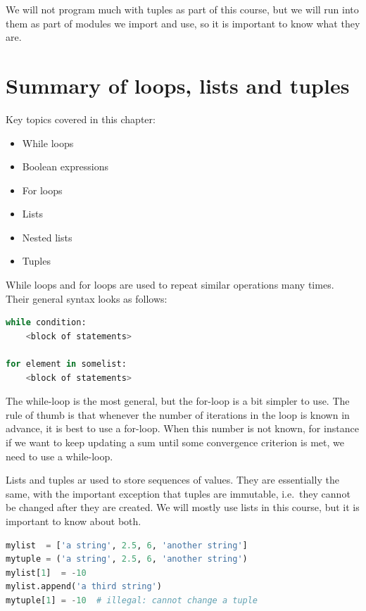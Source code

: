 \documentclass[graybox,envcountchap,sectrefs,final]{svmonodo}
\begin{document}
\noindent
We will not program much with tuples as part of this course, but we will run into them as part of modules
we import and use, so it is important to know what they are.

\section{Summary of loops, lists and tuples}
Key topics covered in this chapter:

\begin{itemize}
 \item While loops

 \item Boolean expressions

 \item For loops

 \item Lists

 \item Nested lists

 \item Tuples
\end{itemize}

\noindent
While loops and for loops are used to repeat similar operations many times. Their general syntax looks as follows:

\begin{lstlisting}[language=Python,style=blue1]
while condition:
    <block of statements>

for element in somelist:
    <block of statements>
\end{lstlisting}
The while-loop is the most general, but the for-loop is a bit simpler to use. The rule of thumb is that whenever
the number of iterations in the loop is known in advance, it is best to use a for-loop. When this number is not known,
for instance if we want to keep updating a sum until some convergence criterion is met, we need to use a while-loop.


Lists and tuples ar used to store sequences of values. They are essentially the same, with the important exception that tuples
are immutable, i.e.~they cannot be changed after they are created. We will mostly use lists in this course, but it is important to know
about both.

\begin{lstlisting}[language=Python,style=blue1]
mylist  = ['a string', 2.5, 6, 'another string']
mytuple = ('a string', 2.5, 6, 'another string')
mylist[1]  = -10
mylist.append('a third string')
mytuple[1] = -10  # illegal: cannot change a tuple
\end{lstlisting}
\end{document}
